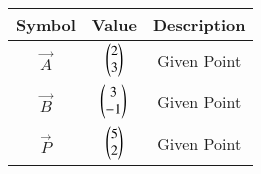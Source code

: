 \begin{tabular}{|c|c|c|}
     \hline
     \textbf{Symbol}& \textbf{Value} & \textbf{Description} \\
     \hline
     $\vec{A}$ & $\begin{pmatrix}2 \\ 3 \end{pmatrix}$ & Given Point \\ 
     \hline
     $\vec{B}$  & $\begin{pmatrix}3 \\ -1\end{pmatrix}$ & Given Point \\ 
     \hline
     $\vec{P}$ & $\begin{pmatrix} 5 \\ 2 \end{pmatrix}$ & Given Point \\ 
     \hline
\end{tabular}
